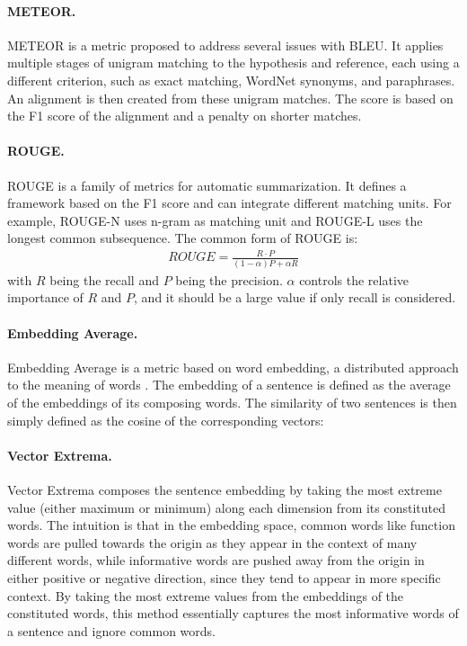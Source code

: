 \documentclass[runningheads]{llncs}
\begin{document}
    \paragraph{METEOR.}
    METEOR \cite{METEOR} is a metric proposed to address several issues with BLEU. It applies multiple stages of unigram matching to the hypothesis and reference, each using a different criterion, such as exact matching, WordNet synonyms, and paraphrases. An alignment is then created from these unigram matches. The score is based on the F1 score of the alignment and a penalty on shorter matches.

    \paragraph{ROUGE.}
    ROUGE \cite{ROUGE} is a family of metrics for automatic summarization. It defines a framework based on the F1 score and can integrate different matching units. For example, ROUGE-N uses n-gram as matching unit and ROUGE-L uses the longest common subsequence. The common form of ROUGE is:
    \begin{align}
        \textit{ROUGE} = \frac{
        R \cdot P
        }{(1 - \alpha) P + \alpha R}
    \end{align}
    with $R$ being the recall and $P$ being the precision. $\alpha$ controls the relative importance of $R$ and $P$, and it should be a large value if only recall is considered.

    \paragraph{Embedding Average.}
    Embedding Average is a metric based on word embedding, a distributed approach to the meaning of words \cite{word2vec}. The embedding of a sentence is defined as the average of the embeddings of its composing words. The similarity of two sentences is then simply defined as the cosine of the corresponding vectors:

    \paragraph{Vector Extrema.}
    Vector Extrema \cite{Vector_Extrema} composes the sentence embedding by taking the most extreme value (either maximum or minimum) along each dimension from its constituted words. The intuition is that in the embedding space, common words like function words are pulled towards the origin as they appear in the context of many different words, while informative words are pushed away from the origin in either positive or negative direction, since they tend to appear in more specific context. By taking the most extreme values from the embeddings of the constituted words, this method essentially captures the most informative words of a sentence and ignore common words.
\end{document}
